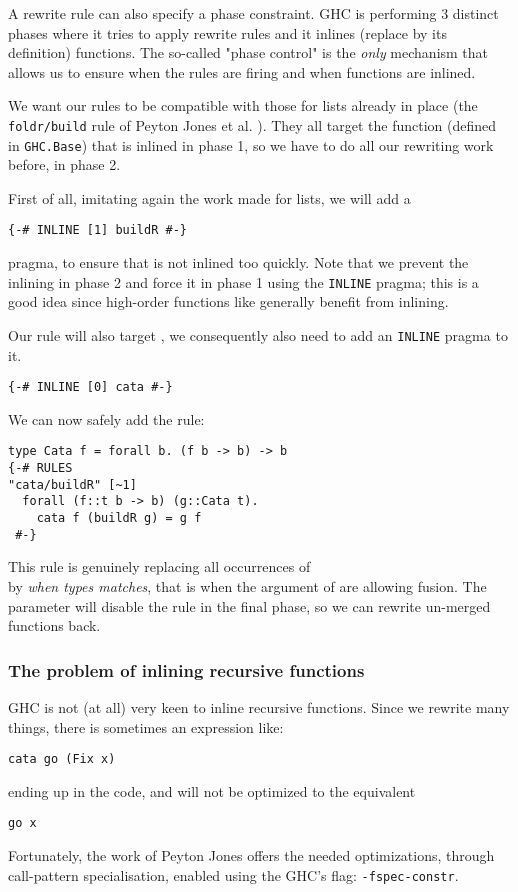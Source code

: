 A rewrite rule can also specify a phase constraint. GHC is performing 3 distinct phases where it tries to apply rewrite rules and it inlines (replace by its definition) functions. The so-called "phase control" is the \emph{only} mechanism that allows us to ensure when the rules are firing and when functions are inlined.

We want our rules to be compatible with those for lists already in place (the \verb|foldr/build| rule of Peyton Jones et al. \cite{pbr}). They all target the  function (defined in \verb|GHC.Base|) that is inlined in phase 1, so we have to do all our rewriting work before, in phase 2.

First of all, imitating again the work made for lists, we will add a
\begin{verbatim}
{-# INLINE [1] buildR #-}
\end{verbatim}
pragma, to ensure that  is not inlined too quickly. Note that we prevent the inlining in phase 2 and force it in phase 1 using the \verb|INLINE| pragma; this is a good idea since high-order functions like  generally benefit from inlining.

Our rule will also target , we consequently also need to add an \verb|INLINE| pragma to it.
\begin{verbatim}
{-# INLINE [0] cata #-}
\end{verbatim}

\noindent We can now safely add the rule:
\begin{verbatim}
type Cata f = forall b. (f b -> b) -> b
{-# RULES
"cata/buildR" [~1]
  forall (f::t b -> b) (g::Cata t).
    cata f (buildR g) = g f
 #-}
\end{verbatim}
This rule is genuinely replacing all occurrences of\\  by  \emph{when types matches}, that is when the argument of  are allowing fusion. The \hs{[~1]} parameter will disable the rule in the final phase, so we can rewrite un-merged functions back.

\subsubsection{The problem of inlining recursive functions}
GHC is not (at all) very keen to inline recursive functions. Since we rewrite many things, there is sometimes an expression like:
\begin{verbatim}
cata go (Fix x)
\end{verbatim}
ending up in the code, and will not be optimized to the equivalent
\begin{verbatim}
go x
\end{verbatim}
Fortunately, the work of Peyton Jones \cite{PeytonJones:2007:CSH:1291151.1291200} offers the needed optimizations, through call-pattern specialisation, enabled using the GHC's flag: \verb|-fspec-constr|.

